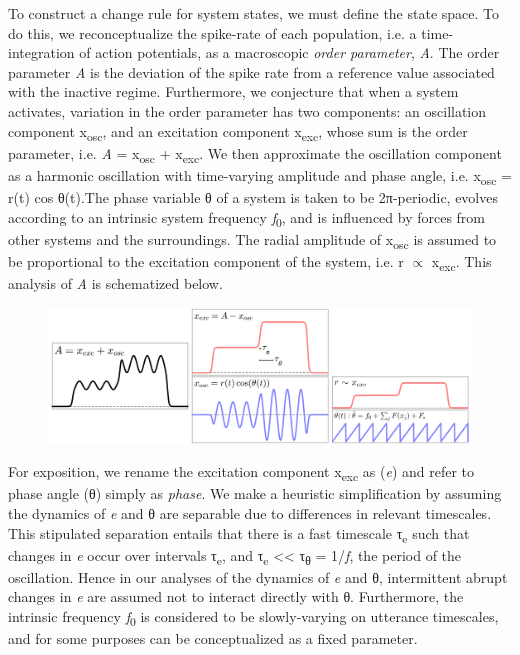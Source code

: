 To construct a change rule for system states, we must define the state space. To do this, we reconceptualize the spike-rate of each population, i.e. a time-integration of action potentials, as a macroscopic \textit{order parameter}, \textit{A}. The order parameter \textit{A} is the deviation of the spike rate from a reference value associated with the inactive regime. Furthermore, we conjecture that when a system activates, variation in the order parameter has two components: an oscillation component x\textsubscript{osc}, and an excitation component x\textsubscript{exc}, whose sum is the order parameter, i.e. \textit{A} = x\textsubscript{osc} + x\textsubscript{exc}. We then approximate the oscillation component as a harmonic oscillation with time-varying amplitude and phase angle, i.e. x\textsubscript{osc} = r(t) cos θ(t).The phase variable θ of a system is taken to be 2π{}-periodic, evolves according to an intrinsic system frequency \textit{f}\textsubscript{0}, and is influenced by forces from other systems and the surroundings. The radial amplitude of x\textsubscript{osc} is assumed to be proportional to the excitation component of the system, i.e. r  ${\propto}$ x\textsubscript{exc}. This analysis of \textit{A} is schematized below.  

  
\begin{figure}
\includegraphics[width=\textwidth]{figures/Tilsen-img12.png}
\caption{\missingcaption}
\label{fig:}
\end{figure}
 

  For exposition, we rename the excitation component x\textsubscript{exc} as (\textit{e}) and refer to phase angle (θ) simply as \textit{phase}. We make a heuristic simplification by assuming the dynamics of \textit{e} and θ are separable due to differences in relevant timescales. This stipulated separation entails that there is a fast timescale τ\textsubscript{e} such that changes in \textit{e} occur over intervals τ\textsubscript{e}, and τ\textsubscript{e} << τ\textsubscript{θ} = 1/\textit{f}, the period of the oscillation. Hence in our analyses of the dynamics of \textit{e} and θ, intermittent abrupt changes in \textit{e} are assumed not to interact directly with θ. Furthermore, the intrinsic frequency \textit{f}\textsubscript{0} is considered to be slowly-varying on utterance timescales, and for some purposes can be conceptualized as a fixed parameter. 

